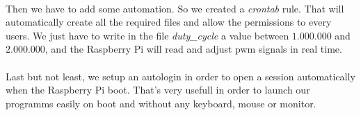 \paragraph{}
Then we have to add some automation. So we created a \textit{crontab} rule.
That will automatically create all the required files and allow the permissions
to every users. We just have to write in the file \textit{duty\_cycle} a value between
$1.000.000$ and $2.000.000$, and the Raspberry Pi will read and adjust pwm signals
in real time.

\paragraph{}
Last but not least, we setup an autologin in order to open a session automatically
when the Raspberry Pi boot. That's very usefull in order to launch our programms
easily on boot and without any keyboard, mouse or monitor.